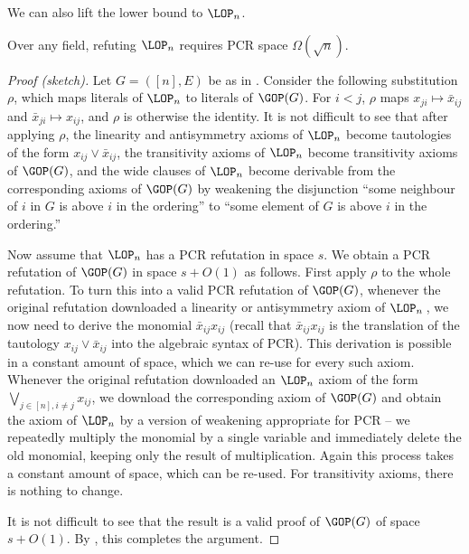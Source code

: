 We can also lift the lower bound to $\LOP_n$.
\begin{corollary} 
Over any field, refuting $\LOP_n$ requires PCR space $\Omega(\sqrt{n})$. 
\end{corollary}
%
\begin{proof}[Proof (sketch)] %
Let  $G=([n],E)$ be as in .
Consider the following substitution $\rho$,
which maps literals of $\LOP_n$ to literals of $\GOP(G)$.
For $i<j$,
$\rho$ maps $x_{ji} \mapsto \bar x_{ij}$
and $\bar x_{ji} \mapsto x_{ij}$, 
and $\rho$ is otherwise the identity.
It is not difficult to see that after applying $\rho$, the linearity and antisymmetry axioms of $\LOP_n$ become
tautologies of the form $x_{ij} \vee \bar x_{ij}$,
the transitivity axioms of $\LOP_n$ become transitivity axioms of $\GOP(G)$,
and the  wide clauses of $\LOP_n$ become 
derivable from the corresponding axioms of $\GOP(G)$
by weakening the disjunction 
``some neighbour of $i$ in $G$ is above $i$ in the ordering''
to ``some element of $G$ is above $i$ in the ordering.''

Now assume that $\LOP_n$ has a PCR refutation in space $s$. 
We obtain a PCR refutation of $\GOP(G)$ 
in space $s+O(1)$ as follows.
First apply $\rho$ to the whole refutation. To turn this into a valid PCR refutation of $\GOP(G)$, 
whenever the original refutation downloaded a linearity or antisymmetry axiom of $\LOP_n$\,, 
we now need to derive the monomial $\bar x_{ij}  x_{ij}$ 
(recall that $\bar x_{ij} x_{ij}$ is the translation of the
tautology $x_{ij} \vee \bar x_{ij}$ into the algebraic syntax of PCR).
This derivation is possible in a constant amount of space, which we
can re-use for every such axiom.
Whenever the original refutation downloaded an $\LOP_n$ axiom of the form $\bigvee_{j\in [n], i\not =j} x_{ij}$,
we download the corresponding axiom of $\GOP(G)$ and obtain the axiom of $\LOP_n$ by a version of weakening appropriate for PCR -- 
we repeatedly multiply the monomial by a single variable and immediately delete the old monomial, keeping only the result of multiplication.
Again this process takes a constant amount of space, which can be re-used.
For transitivity axioms, there is nothing to change. 

It is not difficult to see that the result is a valid proof of $\GOP(G)$ of space~$s+O(1)$.
By , this completes the argument.
\end{proof}


